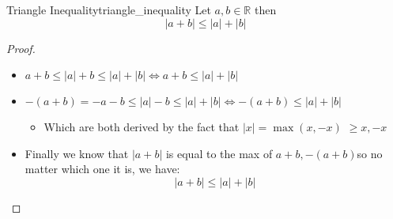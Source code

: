 \begin{theorem}{Triangle Inequality}{triangle_inequality}
    Let $ a, b \in \mathbb{R}$ then 
    \[
    \left| a  +  b \right| \le \left| a \right|  +  \left| b \right|
    \]
\end{theorem}
\begin{proof}
    \begin{itemize}
        \item $ a  +  b \le \left| a \right|  +  b \le \left| a  \right|  +  \left| b \right| \Leftrightarrow a  +  b \le \left| a \right|  +  \left| b \right|$ 
        \item $ - \left( a  +  b  \right) =   - a    - b \le \left|  a \right|   - b \le \left|   a \right|  +  \left|   b \right| \Leftrightarrow -\left( a  + b \right) \le \left| a \right|  +  \left| b \right|$ 
        \begin{itemize}
            \item Which are both derived by the fact that \hyperref[lemma:absolute_value_is_equal_to_max]{$ \left|x  \right| =  \max\left(x ,  - x\right)$} $\ge x,  - x$ 
        \end{itemize}
        \item Finally we know that  $ \left| a +  b \right|  $ is equal to the max of $ a +  b, -  \left( a +  b \right)  $so no matter which one it is, we have: 
            \[
            \left| a  + b \right| \le \left| a  \right|  +  \left| b \right|
            \]
    \end{itemize}
\end{proof}
